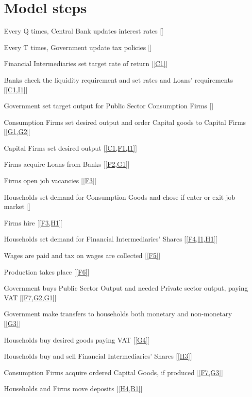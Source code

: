 \documentclass[a4paper, headings=standardclasses]{scrartcl}
\begin{document}
\section{Model steps}
\begin{steps}
	\item \label{C1} Every Q times, Central Bank updates interest rates []
	\item \label{G1} Every T times, Government update tax policies []
	\item \label{I1} Financial Intermediaries set target rate of return [\cref{C1}]
	\item \label{B1} Banks check the liquidity requirement and set rates and Loans' requirements [\cref{C1,I1}]
	\item \label{G2} Government set target output for Public Sector Consumption Firms []
	\item \label{F1} Consumption Firms set desired output and order Capital goods to Capital Firms [\cref{G1,G2}]
	\item \label{F2} Capital Firms set desired output [\cref{C1,F1,I1}]
	\item \label{F3} Firms acquire Loans from Banks [\cref{F2,G1}]
	\item \label{F4} Firms open job vacancies [\cref{F3}]
	\item \label{H1} Households set demand for Consumption Goods and chose if enter or exit job market []
	\item \label{F5} Firms hire [\cref{F3,H1}]
	\item \label{H2} Households set demand for Financial Intermediaries' Shares [\cref{F4,I1,H1}]
	\item \label{F6} Wages are paid and tax on wages are collected [\cref{F5}]
	\item \label{F7} Production takes place [\cref{F6}]
	\item \label{G3} Government buys Public Sector Output and needed Private sector output, paying VAT [\cref{F7,G2,G1}]
	\item \label{G4} Government make transfers to households both monetary and non-monetary  [\cref{G3}]
	\item \label{H3} Households buy desired goods paying VAT [\cref{G4}]
	\item \label{H4} Households buy and sell Financial Intermediaries' Shares [\cref{H3}]
	\item \label{F8} Consumption Firms acquire ordered Capital Goods, if produced [\cref{F7,G3}]
	\item \label{B2} Households and Firms move deposits [\cref{H4,B1}]

\end{steps}
\end{document}
